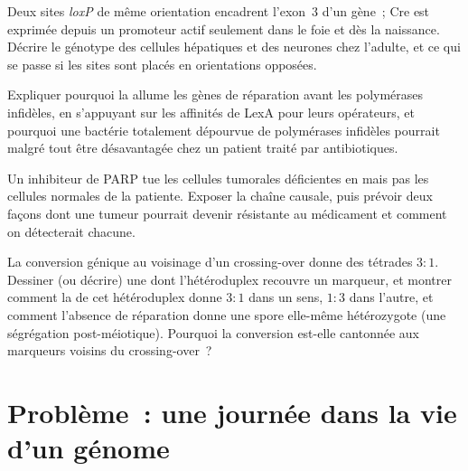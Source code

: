 \begin{exercise}[$\star\star$]\label{exo:b3:dna-repair:9}
Deux sites \emph{loxP} de même orientation encadrent l'exon~3 d'un
gène~; Cre est exprimée depuis un promoteur actif seulement dans le
foie et dès la naissance. Décrire le génotype des cellules hépatiques
et des neurones chez l'adulte, et ce qui se passe si les sites sont
placés en orientations opposées.
\end{exercise}

\begin{exercise}[$\star\star\star$]\label{exo:b3:dna-repair:10}
Expliquer pourquoi la  allume les gènes de réparation avant
les polymérases infidèles, en s'appuyant sur les affinités de LexA pour
leurs opérateurs, et pourquoi une bactérie totalement dépourvue de
polymérases infidèles pourrait malgré tout être désavantagée chez un
patient traité par antibiotiques.
\end{exercise}

\begin{exercise}[$\star\star\star$]\label{exo:b3:dna-repair:11}
Un inhibiteur de PARP tue les cellules tumorales déficientes en
\emph{} mais pas les cellules normales de la patiente. Exposer la
chaîne causale, puis prévoir deux façons dont une tumeur pourrait
devenir résistante au médicament et comment on détecterait chacune.
\end{exercise}

\begin{exercise}[$\star\star\star$]\label{exo:b3:dna-repair:12}
La conversion génique au voisinage d'un crossing-over donne des
tétrades $3{:}1$. Dessiner (ou décrire) une  dont
l'hétéroduplex recouvre un marqueur, et montrer comment la  de cet hétéroduplex donne $3{:}1$ dans un sens,
$1{:}3$ dans l'autre, et comment l'absence de réparation donne une
spore elle-même hétérozygote (une ségrégation post-méiotique). Pourquoi
la conversion est-elle cantonnée aux marqueurs voisins du
crossing-over~?
\end{exercise}

\section{Problème~: une journée dans la vie d'un génome}

